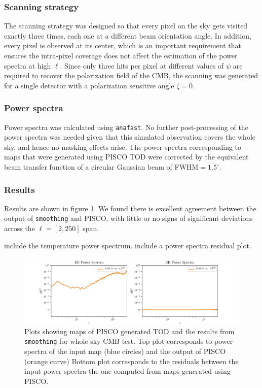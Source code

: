 \documentclass[a4paper,11pt]{article}
\begin{document}
\subsubsection{Scanning strategy}

The scanning strategy was designed so that every pixel on the sky gets visited exactly three times, each one at a different beam orientation angle. In addition, every pixel is observed at its center, which is an important requirement that ensures the intra-pixel coverage does not affect the estimation of the power spectra at high $\ell$. Since only three hits per pixel at different values of $\psi$ are required to recover the polarization field of the CMB, the scanning was generated for a single detector with a polarization sensitive angle $\zeta=0$.

\subsubsection{Power spectra}

Power spectra was calculated using \texttt{anafast}. No further post-processing of the power spectra was needed given that this simulated observation covers the whole sky, and hence no masking effects arise. The power spectra corresponding to maps that were generated using PISCO TOD were corrected by the equivalent beam transfer function of a circular Gaussian beam of FWHM$=1.5^\circ$. 

\subsubsection{Results}

Results are shown in figure \ref{fig::pisco4wholesky}. We found there is excellent agreement between the output of \texttt{smoothing} and PISCO, with little or no signs of significant deviations across the $\ell=[2,250]$ span. 

include the temperature power spectrum.
include a power spectra residual plot.

\begin{figure}
	\centering
	\includegraphics[width=1\linewidth]{figures/ps_r0d00.pdf}
	\caption{Plots showing maps of PISCO generated TOD and the results from \texttt{smoothing} for whole sky CMB test. Top plot corresponds to power spectra of the input map (blue circles) and the output of PISCO (orange curve) Bottom plot corresponds to the residuals between the input power spectra the one computed from maps generated using PISCO.}
	\label{fig::pisco4wholesky}
\end{figure}
\end{document}
